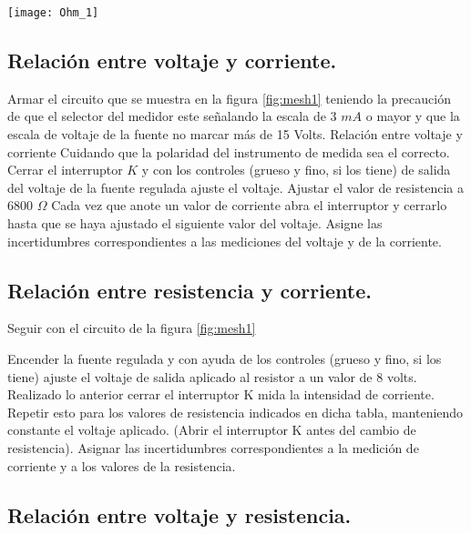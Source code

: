 \documentclass[11pt]{article}
\newenvironment{Figuras}
  {\par\medskip\noindent\minipage{\linewidth}}
  {\endminipage\par\medskip}
\begin{document}
\begin{multicols}{2}
	\begin{Figuras}
		\centering
	    \texttt{[image: Ohm\_1]}
	    \label{fig:mesh1}
	\end{Figuras}

	\subsection{Relación entre voltaje y corriente.}

	Armar el circuito que se muestra en la figura \ref{fig:mesh1} teniendo la precaución de que el selector del medidor este señalando la escala de 3 $mA$ o mayor y que la escala de voltaje de la fuente no marcar más de 15 Volts. Relación entre voltaje y corriente
	Cuidando que la polaridad del instrumento de medida sea el correcto.
	Cerrar el interruptor $K$ y con los controles (grueso y fino, si los tiene) de salida del voltaje de la fuente regulada ajuste el voltaje.
	Ajustar el valor de resistencia a 6800 $\Omega$
	Cada vez que anote un valor de corriente abra el interruptor y cerrarlo hasta que se haya ajustado el siguiente valor del voltaje.
	Asigne las incertidumbres correspondientes a las mediciones del voltaje y de la corriente.

	\subsection{Relación entre resistencia y corriente.}

	Seguir con el circuito de la figura \ref{fig:mesh1}

	Encender la fuente regulada y con ayuda de los controles (grueso y fino, si los tiene) ajuste el voltaje de salida aplicado al resistor a un valor de 8 volts. 
	Realizado lo anterior cerrar el interruptor K mida la intensidad de corriente. Repetir esto para los valores de resistencia indicados en dicha tabla, manteniendo constante el voltaje aplicado. (Abrir el interruptor K antes del cambio de resistencia).
	Asignar las incertidumbres correspondientes a la medición de corriente y a los valores de la resistencia.

	\subsection{Relación entre voltaje y resistencia.}


\end{multicols}
\end{document}
